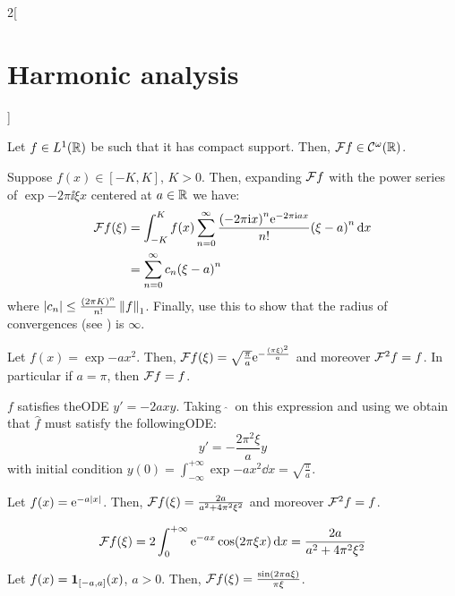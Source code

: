 \documentclass[../../../main_math.tex]{subfiles}
\begin{document}
\begin{multicols}{2}[\section{Harmonic analysis}]
  \begin{proposition}
    Let $f\in L^1(\mathbb{R})$ be such that it has compact support. Then, $\mathcal{F} f\in\mathcal{C}^\omega(\mathbb{R})$.
  \end{proposition}
  \begin{sproof}
    Suppose $f(x)\in[-K,K]$, $K>0$. Then, expanding $\mathcal{F} f$ with the power series of $\exp{-2\pi\ii\xi x}$ centered at $a\in\mathbb{R}$ we have:
    \begin{align*}
      \mathcal{F} f(\xi) & =\int_{-K}^Kf(x)\sum_{n=0}^{\infty}\frac{{(-2\pi\mathrm{i} x)}^n\mathrm{e}^{-2\pi\mathrm{i} a x}}{n!}{(\xi-a)}^n\dd{x} \\
                & =\sum_{n=0}^\infty c_n{(\xi-a)}^n
    \end{align*}
    where $\abs{c_n}\leq\frac{{(2\pi K)}^n}{n!}\left\|f\right\|_1$. Finally, use this to show that the radius of convergences (see ) is $\infty$.
  \end{sproof}
  \begin{lemma}\label{HA:expX2}
    Let $f(x)=\exp{-a x^2}$. Then, $\mathcal{F} f(\xi)=\sqrt{\frac{\pi}{a}}\mathrm{e}^{-\frac{{(\pi \xi)}^2}{a}}$ and moreover $\mathcal{F}^2f=f$. In particular if $a=\pi$, then $\mathcal{F} f=f$.
  \end{lemma}
  \begin{sproof}
    $f$ satisfies theODE $y'=-2a x y$. Taking $\ \widehat{}\ $ on this expression and using  we obtain that $\widehat{f}$ must satisfy the followingODE:
    $$y'=-\frac{2\pi^2\xi}{a} y$$
    with initial condition $y(0)=\int_{-\infty}^{+\infty}\exp{-a x^2}\dd{x}=\sqrt{\frac{\pi}{a}}$.
  \end{sproof}
  \begin{lemma}\label{HA:expAbsX}
    Let $f(x)=\mathrm{e}^{-a\abs{x}}$. Then, $\mathcal{F} f(\xi)=\frac{2a}{a^2+4\pi^2\xi^2}$ and moreover $\mathcal{F}^2f=f$.
  \end{lemma}
  \begin{sproof}
    $$\mathcal{F} f(\xi)=2\int_0^{+\infty}\mathrm{e}^{-ax}\cos(2\pi\xi x)\dd{x}=\frac{2a}{a^2+4\pi^2\xi^2}$$
  \end{sproof}
  \begin{lemma}
    Let $f(x)=\boldsymbol{\mathrm{1}}_{[-a,a]}(x)$, $a>0$. Then, $\mathcal{F} f(\xi)=\frac{\sin(2\pi a\xi)}{\pi\xi}$.
  \end{lemma}

\end{multicols}
\end{document}
